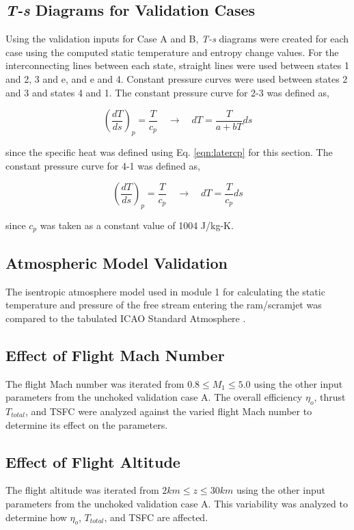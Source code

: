 \documentclass[conf]{new-aiaa} %
\begin{document}
\subsection{\textit{T-s} Diagrams for Validation Cases} %
Using the validation inputs for Case A and B, \textit{T-s} diagrams were created for each case using the computed static temperature and entropy change values. For the interconnecting lines between each state, straight lines were used between states 1 and 2, 3 and e, and e and 4. Constant pressure curves were used between states 2 and 3 and states 4 and 1. The constant pressure curve for 2-3 was defined as,

\begin{equation}
    \label{eqn:constp_23}
    \left(\frac{dT}{ds}\right)_p=\frac{T}{c_p} \quad \rightarrow \quad dT=\frac{T}{a+bT}ds
\end{equation}

since the specific heat was defined using Eq. \ref{eqn:latercp} for this section. The constant pressure curve for 4-1 was defined as,

\begin{equation}
    \label{eqn:constp_41}
    \left(\frac{dT}{ds}\right)_p=\frac{T}{c_p} \quad \rightarrow \quad dT=\frac{T}{c_p}ds
\end{equation}

since $c_p$ was taken as a constant value of 1004 J/kg-K.

\subsection{Atmospheric Model Validation} %
The isentropic atmosphere model used in module 1 for calculating the static temperature and pressure of the free stream entering the ram/scramjet was compared to the tabulated ICAO Standard Atmosphere \cite{hill1992propulsion}.

\subsection{Effect of Flight Mach Number} %
The flight Mach number was iterated from $0.8\leq M_1\leq 5.0$ using the other input parameters from the unchoked validation case A. The overall efficiency $\eta_o$, thrust $T_{total}$, and TSFC were analyzed against the varied flight Mach number to determine its effect on the parameters.

\subsection{Effect of Flight Altitude} %
The flight altitude was iterated from $2 km \leq z \leq 30 km$ using the other input parameters from the unchoked validation case A. This variability was analyzed to determine how $\eta_o$, $T_{total}$, and TSFC are affected.
\end{document}
